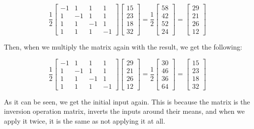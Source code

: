 \documentclass[12pt]{article}
\begin{document}
\[ \frac{1}{2} \begin{bmatrix} -1 & 1 & 1 & 1 \\ 1 & -1 & 1 & 1 \\ 1 & 1 & -1 & 1 \\ 1 & 1 & 1 & -1 \end{bmatrix} \begin{bmatrix} 15 \\ 23 \\ 18 \\ 32 \end{bmatrix} = \frac{1}{2} \begin{bmatrix} 58 \\ 42 \\ 52 \\ 24 \end{bmatrix} = \begin{bmatrix} 29 \\ 21 \\ 26 \\ 12 \end{bmatrix} \]

Then, when we multiply the matrix again with the result, we get the following:

\[ \frac{1}{2} \begin{bmatrix} -1 & 1 & 1 & 1 \\ 1 & -1 & 1 & 1 \\ 1 & 1 & -1 & 1 \\ 1 & 1 & 1 & -1 \end{bmatrix} \begin{bmatrix} 29 \\ 21 \\ 26 \\ 12 \end{bmatrix} = \frac{1}{2} \begin{bmatrix} 30 \\ 46 \\ 36 \\ 64 \end{bmatrix} = \begin{bmatrix} 15 \\ 23 \\ 18 \\ 32 \end{bmatrix} \]

As it can be seen, we get the initial input again. This is because the matrix is the inversion operation matrix, inverts the inputs around their means, and when we apply it twice, it is the same as not applying it at all.
\end{document}
